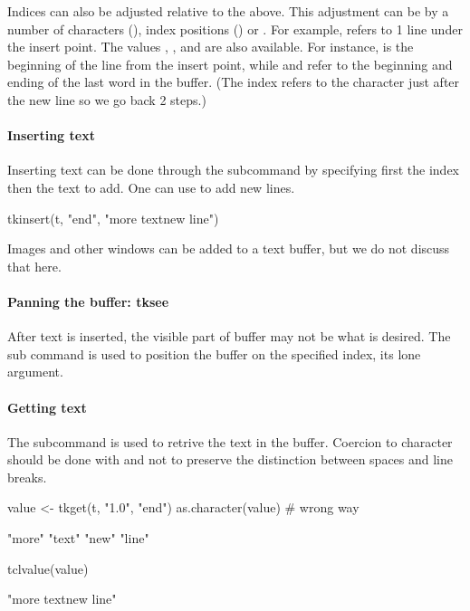 Indices can also be adjusted relative to the above. This adjustment can be by a number of characters (), index positions () or . For example,  refers to 1 line under the insert point. The values , ,  and  are also available. For instance,  is the beginning of the line from the insert point, while  and  refer to the beginning and ending of the last word in the buffer. (The  index refers to the character just after the new line so we go back 2 steps.)


\paragraph{Inserting text}
Inserting text can be done through the 
subcommand by specifying first the index then the text to add. One can use  to add new lines.
\begin{Schunk}
\begin{Sinput}
 tkinsert(t, "end", "more text\n new line")  
\end{Sinput}
\end{Schunk}
Images and other windows can be added to a text buffer, but we do not discuss that here.

\paragraph{Panning the buffer: tksee}
After text is inserted, the visible part of buffer may not be what is
desired. The  sub command is used to position
the buffer on the specified index, its lone argument.

\paragraph{Getting text}
The  subcommand is used to retrive the text in the buffer. Coercion to character should be done with  and not  to preserve the distinction between spaces and line breaks.

\begin{Schunk}
\begin{Sinput}
 value <- tkget(t, "1.0", "end")
 as.character(value)                     # wrong way
\end{Sinput}
\begin{Soutput}
[1] "more" "text" "new"  "line"
\end{Soutput}
\begin{Sinput}
 tclvalue(value)
\end{Sinput}
\begin{Soutput}
[1] "more text\n new line\n"
\end{Soutput}
\end{Schunk}

